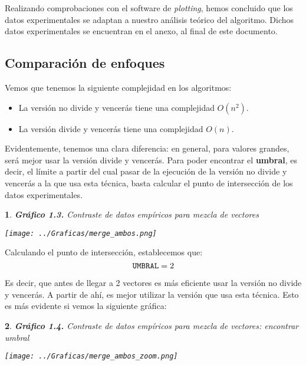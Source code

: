 \documentclass[10pt, a4paper]{article}
\theoremstyle{theorem-style}
\newtheorem*{datos}{}
\theoremstyle{theorem-style}
\theoremstyle{definition-style}
\theoremstyle{remark-style}
\theoremstyle{example-style}
\theoremstyle{definition-style}
\theoremstyle{remark-style}
\begin{document}
Realizando comprobaciones con el software de \emph{plotting}, hemos concluido que los datos experimentales se adaptan a nuestro análisis teórico del algoritmo. Dichos datos experimentales se encuentran en el anexo, al final de este documento.

\pagebreak
\subsection{Comparación de enfoques}

Vemos que tenemos la siguiente complejidad en los algoritmos:

\begin{itemize}
	\item La versión no divide y vencerás tiene una complejidad $O(n^2)$.
	\item La versión divide y vencerás tiene una complejidad $O(n)$.
\end{itemize}

Evidentemente, tenemos una clara diferencia: en general, para valores grandes, será mejor usar la versión divide y vencerás. Para poder encontrar el \textbf{umbral}, es decir, el límite a partir del cual pasar de la ejecución de la versión no divide y vencerás a la que usa esta técnica, basta calcular el punto de intersección de los datos experimentales.


\begin{datos}
	{\bf\sffamily Gráfico 1.3.} {\sffamily Contraste de datos empíricos para mezcla de vectores}\\
	\vspace{-0.7cm}
	\begin{center}
		\texttt{[image: ../Graficas/merge\_ambos.png]}
	\end{center}	
\end{datos}

Calculando el punto de intersección, establecemos que:
$$ \text{\texttt{UMBRAL}} = 2$$

Es decir, que antes de llegar a 2 vectores es más eficiente usar la versión no divide y vencerás. A partir de ahí, es mejor utilizar la versión que usa esta técnica. Esto es más evidente si vemos la siguiente gráfica:
\pagebreak
\begin{datos}
	{\bf\sffamily Gráfico 1.4.} {\sffamily Contraste de datos empíricos para mezcla de vectores: encontrar umbral}\\
	\vspace{-0.7cm}
	\begin{center}
		\texttt{[image: ../Graficas/merge\_ambos\_zoom.png]}
	\end{center}	
\end{datos}
\end{document}
